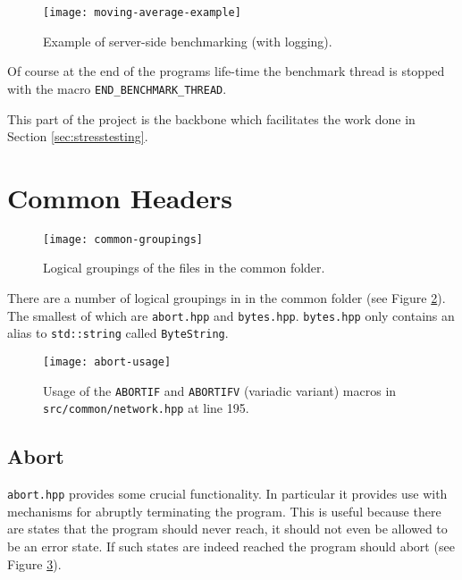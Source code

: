 \documentclass[article]{uom-coursework}
\begin{document}
\begin{figure}[H]
\centering
\texttt{[image: moving-average-example]}
\caption{Example of server-side benchmarking (with logging).}
\label{fig:serversidebenching}
\end{figure}

Of course at the end of the programs life-time the benchmark
thread is stopped with the macro
\texttt{END\_BENCHMARK\_THREAD}.

This part of the project is the backbone which facilitates the
work done in Section \ref{sec:stresstesting}.

\section{Common Headers}

\begin{figure}[H]
\centering
\begin{mdframed}[backgroundcolor=OffWhite]
\texttt{[image: common-groupings]}
\end{mdframed}
\caption{Logical groupings of the files in the common folder.}
\label{fig:commongroups}
\end{figure}

There are a number of logical groupings in in the common folder
(see Figure \ref{fig:commongroups}). The smallest of which are
\texttt{abort.hpp} and \texttt{bytes.hpp}. \texttt{bytes.hpp}
only contains an alias to \texttt{std::string} called
\texttt{ByteString}.

\begin{figure}[H]
\centering
\texttt{[image: abort-usage]}
\caption{Usage of the \texttt{ABORTIF} and \texttt{ABORTIFV}
(variadic variant) macros in \texttt{src/common/network.hpp} at line
195.}
\label{fig:abortusage}
\end{figure}

\subsection{Abort}

\texttt{abort.hpp} provides some crucial functionality. In
particular it provides use with mechanisms for abruptly
terminating the program. This is useful because there are states
that the program should never reach, it should not even be
allowed to be an error state. If such states are indeed reached
the program should abort (see Figure \ref{fig:abortusage}).
\end{document}
